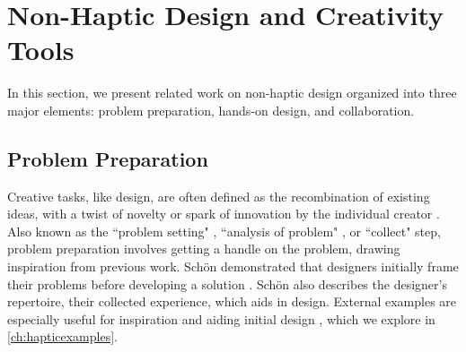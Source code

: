 \section{Non-Haptic Design and Creativity Tools}

In this section, we present related work on non-haptic design organized into three major elements: problem preparation, hands-on design, and collaboration.

\subsection{Problem Preparation}
Creative tasks, like design, are often defined as the recombination of existing ideas, with a twist of novelty or spark of innovation by the individual creator \cite{Warr2005}.
Also known as the ``problem setting" \cite{Schon1982}, ``analysis of problem" \cite{Warr2005}, or ``collect" \cite{Shneiderman2000} step, problem preparation involves getting a handle on the problem,  drawing inspiration from previous work. %
Sch\"{o}n demonstrated that designers initially frame their problems before developing a solution \cite{Schon1982}.
Sch\"{o}n also describes the designer's repertoire, their collected experience, which aids in design.
External examples are especially useful for inspiration and aiding initial design \cite{Herring2009,Buxton2007}, which we explore in \autoref{ch:hapticexamples}.



